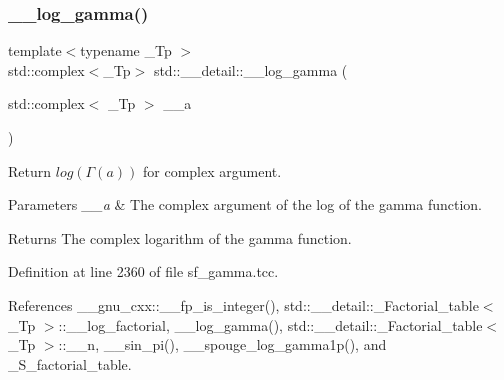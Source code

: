 \mbox{\label{namespacestd_1_1____detail_ad37ad67a4b856eb97b13c8844f9ef8d8}} 
\subsubsection{\texorpdfstring{\+\_\+\+\_\+log\+\_\+gamma()}{\_\_log\_gamma()}\hspace{0.1cm}{\footnotesize\ttfamily [2/2]}}
{\footnotesize\ttfamily template$<$typename \+\_\+\+Tp $>$ \\
std\+::complex$<$\+\_\+\+Tp$>$ std\+::\+\_\+\+\_\+detail\+::\+\_\+\+\_\+log\+\_\+gamma (\begin{DoxyParamCaption}\item[{std\+::complex$<$ \+\_\+\+Tp $>$}]{\+\_\+\+\_\+a }\end{DoxyParamCaption})}



Return $ log(\Gamma(a)) $ for complex argument. 


\begin{DoxyParams}{Parameters}
{\em \+\_\+\+\_\+a} & The complex argument of the log of the gamma function. \\
\hline
\end{DoxyParams}
\begin{DoxyReturn}{Returns}
The complex logarithm of the gamma function. 
\end{DoxyReturn}


Definition at line 2360 of file sf\+\_\+gamma.\+tcc.



References \+\_\+\+\_\+gnu\+\_\+cxx\+::\+\_\+\+\_\+fp\+\_\+is\+\_\+integer(), std\+::\+\_\+\+\_\+detail\+::\+\_\+\+Factorial\+\_\+table$<$ \+\_\+\+Tp $>$\+::\+\_\+\+\_\+log\+\_\+factorial, \+\_\+\+\_\+log\+\_\+gamma(), std\+::\+\_\+\+\_\+detail\+::\+\_\+\+Factorial\+\_\+table$<$ \+\_\+\+Tp $>$\+::\+\_\+\+\_\+n, \+\_\+\+\_\+sin\+\_\+pi(), \+\_\+\+\_\+spouge\+\_\+log\+\_\+gamma1p(), and \+\_\+\+S\+\_\+factorial\+\_\+table.

\mbox{\label{namespacestd_1_1____detail_ac13e31ebcd3c99d6a7cad9010e039315}} 
